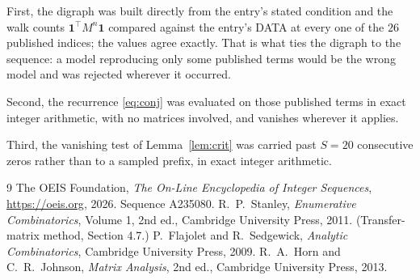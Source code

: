 \documentclass[11pt,a4paper]{article}
\theoremstyle{plain}
\theoremstyle{definition}
\begin{document}
First, the digraph was built directly from the entry's stated condition and the walk counts
$\mathbf{1}^{\!\top}M^{n}\mathbf{1}$ compared against the entry's DATA at every one of
the $26$ published indices; the values agree exactly. That is what ties the digraph to
the sequence: a model reproducing only some published terms would be the wrong model and
was rejected wherever it occurred.

Second, the recurrence \eqref{eq:conj} was evaluated on those published terms in exact
integer arithmetic, with no matrices involved, and vanishes wherever it applies.

Third, the vanishing test of Lemma~\ref{lem:crit} was carried past $S=20$ consecutive
zeros rather than to a sampled prefix, in exact integer arithmetic.

\begin{thebibliography}{9}
 The OEIS Foundation, \emph{The On-Line Encyclopedia of Integer
Sequences}, \url{https://oeis.org}, 2026. Sequence A235080.
 R.~P.~Stanley, \emph{Enumerative Combinatorics}, Volume 1, 2nd ed.,
Cambridge University Press, 2011. (Transfer-matrix method, Section 4.7.)
 P.~Flajolet and R.~Sedgewick, \emph{Analytic Combinatorics}, Cambridge
University Press, 2009.
 R.~A.~Horn and C.~R.~Johnson, \emph{Matrix Analysis}, 2nd ed., Cambridge
University Press, 2013.
\end{thebibliography}
\end{document}
